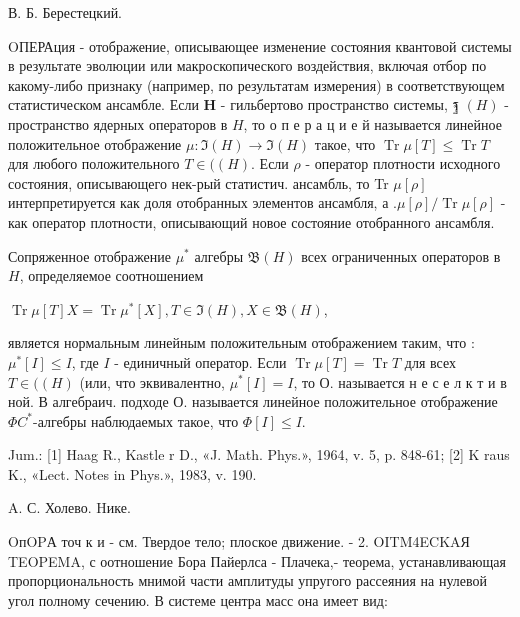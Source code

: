 \documentclass[10pt]{article}
\begin{document}
В. Б. Берестецкий.



OПЕРАция - отображение, описывающее изменение состояния квантовой системы в результате эволюции или макроскопического воздействия, включая отбор по какому-либо признаку (например, по результатам измерения) в соответствующем статистическом ансамбле. Если $\boldsymbol{H}$ - гильбертово пространство системы, ฐ $(H)$ - пространство ядерных операторов в $H$, то о п е р а ц и е й называется линейное положительное отображение $\mathscr{\mu}: \mathfrak{I}(H) \rightarrow \mathfrak{I}(H)$ такое, что $\operatorname{Tr} \mu[T] \leqslant \operatorname{Tr} T$ для любого положительного $T \in \mathfrak{(}(H)$. Если $\rho$ - оператор плотности исходного состояния, описывающего нек-рый статистич. ансамбль, то Tr $\mu[\rho]$ интерпретируется как доля отобранных элементов ансамбля, а $. \mathcal{\mu}[\rho] / \operatorname{Tr} \mathscr{\mu}[\rho]$ - как оператор плотности, описывающий новое состояние отобранного ансамбля.



Сопряженное отображение $\mathscr{\mu}^{*}$ алгебры $\mathfrak{B}(H)$ всех ограниченных операторов в $H$, определяемое соотношением



$\operatorname{Tr} \mathscr{\mu}[T] X=\operatorname{Tr} \mu^{*}[X], T \in \mathfrak{I}(H), X \in \mathfrak{B}(H)$,



является нормальным линейным положительным отображением таким, что : $\mu^{*}[I] \leqslant I$, где $I$ - единичный оператор. Если $\operatorname{Tr} \mathscr{\mu}[T]=\operatorname{Tr} T$ для всех $T \in \mathscr{(}(H)$ (или, что эквивалентно, $\mathscr{\mu}^{*}[I]=I$, то О. называется н е с е л к т и в ной. В алгебраич. подходе О. называется линейное положительное отображение $\Phi C^{*}$-алгебры наблюдаемых такое, что $\Phi[I] \leqslant I$.



Jum.: [1] Haag R., Kastle r D., «J. Math. Phys.», 1964, v. 5, p. 848-61; [2] K raus K., «Lect. Notes in Phys.», 1983, v. 190.



A. С. Холево. Hике.



OпOPА точ к и - см. Твердое тело; плоское движение. - 2. OITM4ECKAЯ TEOPEMA, с оотношение Бора Пайерлса - Плачека,- теорема, устанавливающая пропорциональность мнимой части амплитуды упругого рассеяния на нулевой угол полному сечению. В системе центра масс она имеет вид:
\end{document}
